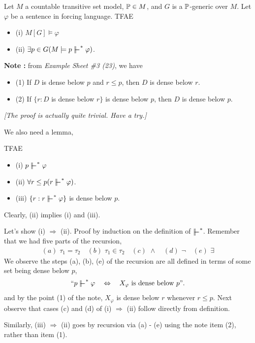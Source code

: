 \documentclass[12pt,a4paper]{article}
\newenvironment{proof}
{\begin{changemargin}{0.5cm}{0.5cm} 
	}%
	{\end{changemargin}
}
\renewenvironment{i}
{\begin{itemize} 
	}%
	{\end{itemize}
}
\newenvironment{p}
{\begin{proof} 
	}%
	{\end{proof}
}
\begin{document}
 Let $M$ a countable transitive set model, $\mathbb{P} \in M$, and $G$ is a $\mathbb{P}$-generic over $M$. Let $\varphi$ be a sentence in forcing language. TFAE
\begin{i}
\item[(i)] $M[G] \models \varphi$
\item[(ii)] $\exists p \in G (M\models p \forces^* \varphi)$.
\end{i}
\s

\textbf{Note :} from \emph{Example Sheet \#3 (23)}, we have
\begin{i}
\item[(1)] If $D$ is dense below $p$ and $r\leq p$, then $D$ is dense below $r$.
\item[(2)] If $\{r : D$ is dense below $r \}$ is dense below $p$, then $D$ is dense below $p$.
\end{i}
\emph{[The proof is actually quite trivial. Have a try.]}
\s

We also need a lemma,
\s

\lem TFAE
\begin{i} 
\item[(i)] $p\forces^* \varphi$
\item[(ii)] $\forall r\leq p (r\forces^* \varphi)$.
\item[(iii)] $\{r: r\forces^* \varphi \}$ is dense below $p$.
\end{i}
\begin{p}
\pf Clearly, (ii) implies (i) and (iii). 
\s

Let's show (i) $\Rightarrow$ (ii). Proof by induction on the definition of $\forces^*$. Remember that we had five parts of the recursion,
\begin{align*}
(a) \,\, \tau_1 = \tau_2 \quad (b) \,\, \tau_1 \in \tau_2 \quad (c) \,\, \wedge \quad (d) \,\, \neg \quad (e) \,\, \exists
\end{align*}
We observe  the steps (a), (b), (e) of the recursion are all defined in terms of some set being dense below $p$,
\begin{align*}
`` p \forces^* \varphi \quad \Leftrightarrow \quad X_{\varphi} \text{ is dense below }p".
\end{align*}
and by the point (1) of the note, $X_{\varphi}$ is dense below $r$ whenever $r\leq p$. Next observe that cases (c) and (d) of (i) $\Rightarrow$ (ii) follow directly from definition. 
\s

Similarly, (iii) $\Rightarrow$ (ii) goes by recursion via (a) - (e) using the note item (2), rather than item (1).

\eop
\end{p}
\s
\end{document}
